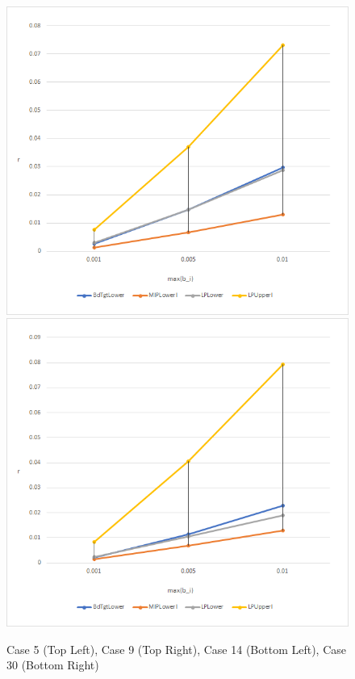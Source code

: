 \begin{figure}[htp!]
\begin{center}
\includegraphics[scale=0.45]{Figures/Case14}
\includegraphics[scale=0.45]{Figures/Case30}
\caption{Case 5 (Top Left), Case 9 (Top Right), Case 14 (Bottom Left), Case 30 (Bottom Right)} 
\label{fig:Graphs1} 
\end{center}
\end{figure}

